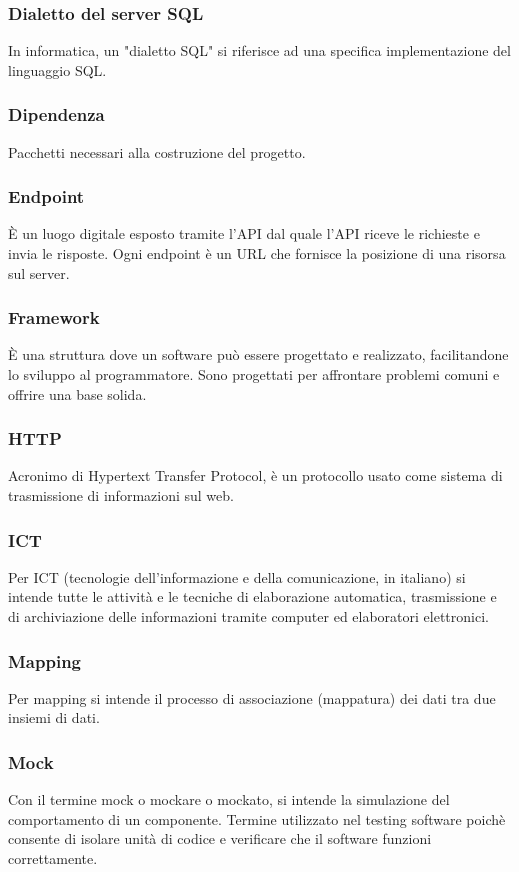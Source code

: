 \subsubsection*{Dialetto del server SQL}
In informatica, un "dialetto SQL" si riferisce ad una specifica implementazione del linguaggio SQL.
\subsubsection*{Dipendenza}
Pacchetti necessari alla costruzione del progetto.
\subsubsection*{Endpoint}
È un luogo digitale esposto tramite l'API dal quale l'API riceve le richieste e invia le risposte. Ogni endpoint è un URL che fornisce la posizione di una risorsa sul server.
\subsubsection*{Framework}
È una struttura dove un software può essere progettato e realizzato, facilitandone lo sviluppo al programmatore. Sono progettati per affrontare problemi comuni e offrire una base solida.
\subsubsection*{HTTP}
Acronimo di Hypertext Transfer Protocol, è un protocollo usato come sistema di trasmissione di informazioni sul web.
\subsubsection*{ICT}
Per ICT (tecnologie dell'informazione e della comunicazione, in italiano) si intende tutte le attività e le tecniche di elaborazione automatica, trasmissione e di archiviazione delle informazioni tramite computer ed elaboratori elettronici.
\subsubsection*{Mapping}
Per mapping si intende il processo di associazione (mappatura) dei dati tra due insiemi di dati.
\subsubsection*{Mock}
Con il termine mock o mockare o mockato, si intende la simulazione del comportamento di un componente. Termine utilizzato nel testing software poichè consente di isolare unità di codice e verificare che il software funzioni correttamente.
